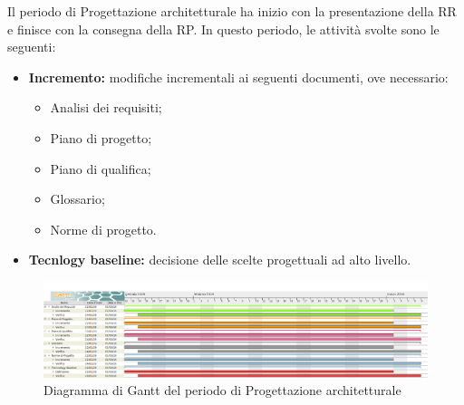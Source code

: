 Il periodo di Progettazione architetturale ha inizio con la presentazione della RR e finisce con la consegna della RP.\newline
In questo periodo, le attività svolte sono le seguenti:
\begin{itemize}
	\item \textbf{Incremento: }modifiche incrementali ai seguenti documenti, ove necessario:
	\begin{itemize}
		\item Analisi dei requisiti;
		\item Piano di progetto;
		\item Piano di qualifica;
		\item Glossario;
		\item Norme di progetto.
	\end{itemize}
	\item \textbf{Tecnlogy baseline: }decisione delle scelte progettuali ad alto livello.
\end{itemize}

\begin{figure}[H]
	\centering
	\includegraphics[width=1\linewidth]{Pianificazione/Progettazione_Architetturale_Gantt.png}
	\caption{Diagramma di Gantt del periodo di Progettazione architetturale}
\end{figure}